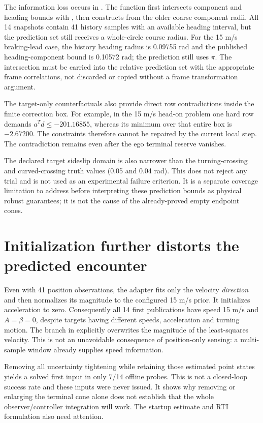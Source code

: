 \documentclass[11pt]{article}
\begin{document}
The information loss occurs in .
The function first intersects component and heading bounds with
, then constructs
 from the older coarse component radii.
All 14 snapshots contain 41 history samples with an available heading interval,
but the prediction set still receives a whole-circle course radius. For the
15 m/s braking-lead case, the history heading radius is 0.09755 rad and the
published heading-component bound is 0.10572 rad; the prediction still uses
$\pi$. The intersection must be carried into the relative prediction set with
the appropriate frame correlations, not discarded or copied without a frame
transformation argument.

The target-only counterfactuals also provide direct row contradictions inside
the finite correction box. For example, in the 15 m/s head-on problem one hard
row demands $a^Td\le-201.16855$, whereas its minimum over that entire box is
$-2.67200$. The constraints therefore cannot be repaired by the current local
step. The contradiction remains even after the ego terminal reserve vanishes.

The declared target sideslip domain is also narrower than the turning-crossing
and curved-crossing truth values (0.05 and 0.04 rad). This does not reject any
trial and is not used as an experimental failure criterion. It is a separate
coverage limitation to address before interpreting these prediction bounds as
physical robust guarantees; it is not the cause of the already-proved empty
endpoint cones.

\section{Initialization further distorts the predicted encounter}
Even with 41 position observations, the adapter fits only the velocity
\emph{direction} and then normalizes its magnitude to the configured 15 m/s
prior. It initializes acceleration to zero. Consequently all 14 first
publications have speed 15 m/s and $A=\beta=0$, despite targets having different
speeds, acceleration and turning motion. The branch in
 explicitly overwrites the magnitude
of the least-squares velocity. This is not an unavoidable consequence of
position-only sensing: a multi-sample window already supplies speed information.

Removing all uncertainty tightening while retaining those estimated point
states yields a solved first input in only 7/14 offline probes. This is not a
closed-loop success rate and these inputs were never issued. It shows why
removing or enlarging the terminal cone alone does not establish that the whole
observer/controller integration will work. The startup estimate and RTI
formulation also need attention.
\end{document}
